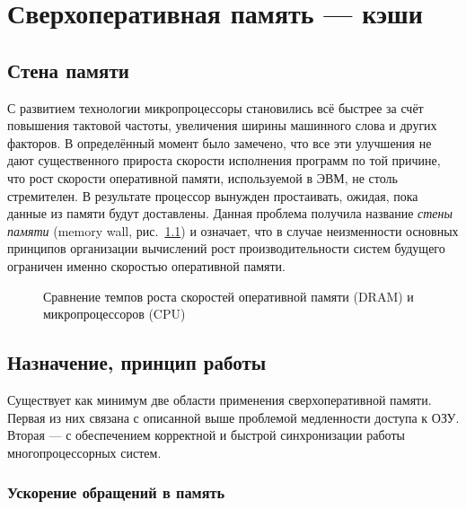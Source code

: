 \chapter{Сверхоперативная память --- кэши}\label{caches}


\section{Стена памяти}

С развитием технологии микропроцессоры становились всё быстрее за счёт повышения тактовой частоты, увеличения ширины машинного слова и других факторов. В определённый момент было замечено, что все эти улучшения не дают существенного прироста скорости исполнения программ по той причине, что рост скорости оперативной памяти, используемой в ЭВМ, не столь стремителен. В результате процессор вынужден простаивать, ожидая, пока данные из памяти будут доставлены. Данная проблема получила название \textit{стены памяти} (\abbr memory wall, рис.~\ref{fig:mem-wall}) и означает, что в случае неизменности основных принципов организации вычислений рост производительности систем будущего ограничен именно скоростью оперативной памяти. 

\begin{figure}[htb]
    \centering
		\iftoggle{htmlpaper}{
		\texttt{[image: drawings/mem-wall-0]}
	}{
		
	}
    \caption[Сравнение темпов роста скоростей памяти и ЦПУ]{Сравнение темпов роста скоростей оперативной памяти (DRAM) и микропроцессоров (CPU)}
    \label{fig:mem-wall}
\end{figure}

\section{Назначение, принцип работы}

Существует как минимум две области применения сверхоперативной памяти. Первая из них связана с описанной выше проблемой медленности доступа к ОЗУ. Вторая --- с обеспечением корректной и быстрой синхронизации работы многопроцессорных систем.

\subsection{Ускорение обращений в память}

